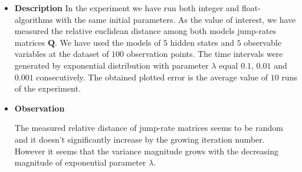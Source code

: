 \documentclass[thesis=M,english]{FITthesis}[2012/10/20]
\newcommand{\matr}[1]{\mathbf{#1}}
\begin{document}
\begin{itemize}
\item \textbf{ Description }
In the experiment we have run both integer and float-algorithms with the same initial parameters. As the value of interest, we have measured the relative euclidean distance among both models jump-rates matrices $\matr{Q}$. We have used the models of $5$ hidden states and $5$ observable variables at the dataset of $100$ observation points. The time intervals were generated by exponential distribution with parameter $\lambda$ equal $0.1$, $0.01$ and $0.001$ consecutively. The obtained plotted error is the average value of $10$ runs of the experiment.      

\item \textbf{ Observation }

The measured relative distance of jump-rate matrices seems to be random and it doesn't significantly increase by the growing iteration number. However it seems that the variance magnitude grows with the decreasing magnitude of exponential parameter $\lambda$.   



\end{itemize}
\end{document}
